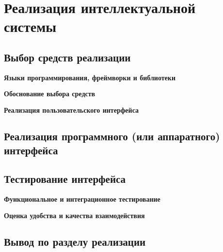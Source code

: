 \section{Реализация интеллектуальной системы}
\label{sec:development}

\subsection{Выбор средств реализации}

\textbf{Языки программирования, фреймворки и библиотеки}


\textbf{Обоснование выбора средств}


\textbf{Реализация пользовательского интерфейса}


\subsection{Реализация программного (или аппаратного) интерфейса}


\subsection{Тестирование интерфейса}

\textbf{Функциональное и интеграционное тестирование}


\textbf{Оценка удобства и качества взаимодействия}


\subsection{Вывод по разделу реализации}


